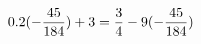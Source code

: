 \documentclass[preview]{standalone}
\begin{document}
\begin{align*}
\special{dvisvgm:raw <g id='unique000'>}0.2(- \frac{45}{184}) + 3 = \frac{3}{4} - 9(- \frac{45}{184})\special{dvisvgm:raw </g>}
\end{align*}
\end{document}
